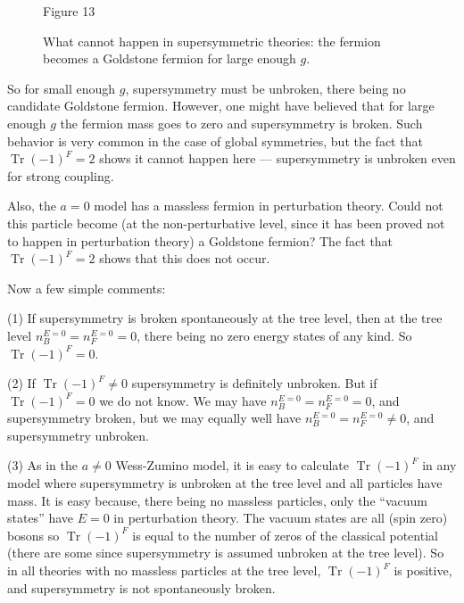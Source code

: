 \begin{figure}
\vspace{-0.4\baselineskip}
\centering
{}
\par\smallskip
Figure 13

What cannot happen in supersymmetric theories: the fermion
becomes a Goldstone fermion for large enough $g$.
\vspace{-0.5\baselineskip}
\end{figure}

So for small enough $g$, supersymmetry must be unbroken, there
being no candidate Goldstone fermion. However, one might have
believed that for large enough $g$
the fermion mass goes to zero and
supersymmetry is broken. Such
behavior is very common in the
case of global symmetries, but
the fact that $\operatorname{Tr}(-1)^F = 2$ shows
it cannot happen here --- supersymmetry is unbroken even for
strong coupling.

Also, the $a = 0$ model has a
massless fermion in perturbation
theory. Could not this particle become (at the non-perturbative
level, since it has been proved not to happen in perturbation theory)
a Goldstone fermion? The fact that $\operatorname{Tr}(-1)^F = 2$ shows that this does
not occur.

Now a few simple comments:

(1) If supersymmetry is broken spontaneously at the tree level,
then at the tree level $n_B^{E=0} = n_F^{E=0} = 0$, there being no zero energy
states of any kind. So $\operatorname{Tr}(-1)^F = 0$.

(2) If $\operatorname{Tr}(-1)^F \neq 0$ supersymmetry is definitely unbroken. But
if $\operatorname{Tr}(-1)^F = 0$ we do not know. We may have $n_B^{E=0} = n_F^{E=0} = 0$, and
supersymmetry broken, but we may equally well have $n_B^{E=0} = n_F^{E=0} \neq 0$,
and supersymmetry unbroken.

(3) As in the $a \neq 0$ Wess-Zumino model, it is easy to calculate
$\operatorname{Tr}(-1)^F$ in any model where supersymmetry is unbroken at the tree
level and all particles have mass. It is easy because, there being
no massless particles, only the ``vacuum states'' have $E = 0$ in perturbation
theory. The vacuum states are all (spin zero) bosons so
$\operatorname{Tr}(-1)^F$ is equal to the number of zeros of the classical potential
(there are some since supersymmetry is assumed unbroken at the tree
level). So in all theories with no massless particles at the tree
level, $\operatorname{Tr}(-1)^F$ is positive, and supersymmetry is not spontaneously
broken.

